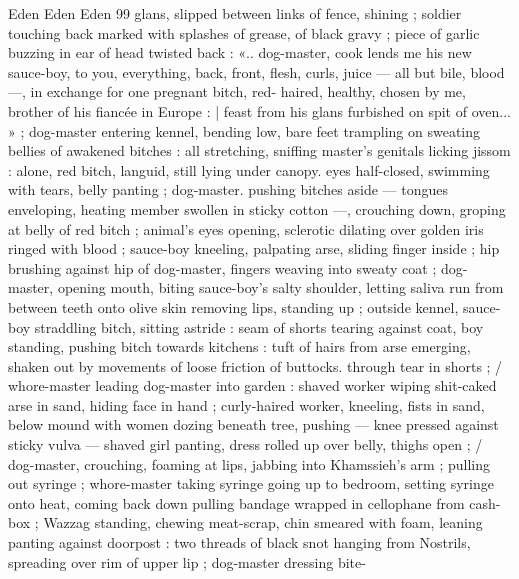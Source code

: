 Eden Eden Eden 99
glans, slipped between links of fence, shining ; soldier touching back
marked with splashes of grease, of black gravy ; piece of garlic
buzzing in ear of head twisted back : «.. dog-master, cook lends me
his new sauce-boy, to you, everything, back, front, flesh, curls, juice
— all but bile, blood —, in exchange for one pregnant bitch, red-
haired, healthy, chosen by me, brother of his fiancée in Europe : |
feast from his glans furbished on spit of oven... » ; dog-master
entering kennel, bending low, bare feet trampling on sweating bellies
of awakened bitches : all stretching, sniffing master's genitals
licking jissom : alone, red bitch, languid, still lying under canopy.
eyes half-closed, swimming with tears, belly panting ; dog-master.
pushing bitches aside — tongues enveloping, heating member
swollen in sticky cotton —, crouching down, groping at belly of red
bitch ; animal's eyes opening, sclerotic dilating over golden iris
ringed with blood ; sauce-boy kneeling, palpating arse, sliding finger
inside ; hip brushing against hip of dog-master, fingers weaving into
sweaty coat ; dog-master, opening mouth, biting sauce-boy's salty
shoulder, letting saliva run from between teeth onto olive skin
removing lips, standing up ; outside kennel, sauce-boy straddling
bitch, sitting astride : seam of shorts tearing against coat, boy
standing, pushing bitch towards kitchens : tuft of hairs from arse
emerging, shaken out by movements of loose friction of buttocks.
through tear in shorts ; / whore-master leading dog-master into
garden : shaved worker wiping shit-caked arse in sand, hiding face
in hand ; curly-haired worker, kneeling, fists in sand, below mound
with women dozing beneath tree, pushing — knee pressed against
sticky vulva — shaved girl panting, dress rolled up over belly, thighs
open ; / dog-master, crouching, foaming at lips, jabbing into
Khamssieh’s arm ; pulling out syringe ; whore-master taking syringe
going up to bedroom, setting syringe onto heat, coming back down
pulling bandage wrapped in cellophane from cash-box ; Wazzag
standing, chewing meat-scrap, chin smeared with foam, leaning
panting against doorpost : two threads of black snot hanging from
Nostrils, spreading over rim of upper lip ; dog-master dressing bite-


